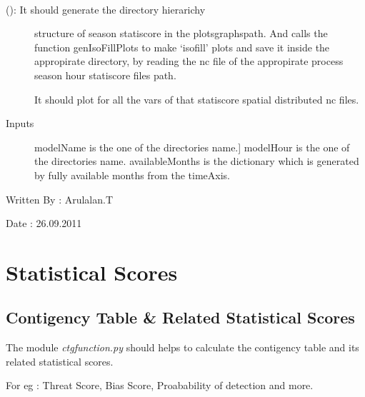 \documentclass[letterpaper,10pt,english]{sphinxmanual}
\begin{document}
\begin{fulllineitems}
\label{diagnosis:generate_stati_score_spatial_distribution_plots.genSeasonStatiScoreDirs}~\begin{description}
\item[{{\hyperref[diagnosis:generate_stati_score_spatial_distribution_plots.genSeasonStatiScoreDirs]{}} (): It should generate the directory hierarichy}] \leavevmode
structure of season statiscore in the plotsgraphspath. And calls the
function genIsoFillPlots to make `isofill' plots and save it
inside the appropirate directory, by reading the nc file of the
appropirate process season hour statiscore files path.

It should plot for all the vars of that statiscore spatial distributed
nc files.

\item[{Inputs}] \leavevmode{[}modelName is the one of the directories name.{]}
modelHour is the one of the directories name.
availableMonths is the dictionary which is generated by fully
available months from the timeAxis.

\end{description}

Written By : Arulalan.T

Date : 26.09.2011

\end{fulllineitems}



\section{Statistical Scores}
\label{diagnosis:statistical-scores}

\subsection{Contigency Table \& Related Statistical Scores}
\label{diagnosis:contigency-table-related-statistical-scores}
The module \emph{ctgfunction.py} should helps to calculate the contigency table and its related statistical scores.

For eg : Threat Score, Bias Score, Proabability of detection and more.
\label{diagnosis:module-ctgfunction}
\end{document}
